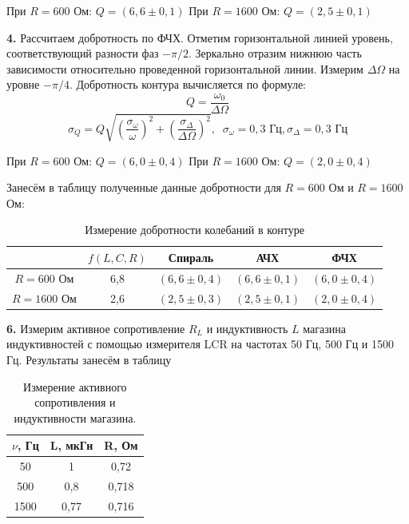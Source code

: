 \documentclass[a4paper, 12pt]{article}
\newcommand{\lr}[1]{\left({#1}\right)} %
\begin{document}
При $R = 600$ Ом: $Q = (6,6 \pm 0,1)$
При $R = 1600$ Ом: $Q = (2,5 \pm 0,1)$

\textbf{4.} Рассчитаем добротность по ФЧХ. Отметим горизонтальной линией уровень, соответствующий разности фаз $-\pi/2$. Зеркально отразим нижнюю часть зависимости относительно проведенной горизонтальной линии. Измерим $\Delta \Omega$ на уровне $-\pi/4$. Добротность контура вычисляется по формуле:
$$Q = \frac{\omega_0}{\Delta \Omega}$$
$$\sigma_Q = Q \sqrt{ \lr{\frac{\sigma_\omega}{\omega}}^2 + \lr{\frac{\sigma_\Delta}{\Delta \Omega}}^2 }, \;\; \sigma_\omega = 0,3 \text{ Гц}, \sigma_\Delta = 0,3 \text{ Гц}$$

При $R = 600$ Ом: $Q = (6,0 \pm 0,4)$
При $R = 1600$ Ом: $Q = (2,0 \pm 0,4)$

Занесём в таблицу полученные данные добротности для $R = 600$ Ом и $R = 1600$ Ом:

\begin{table}[H]
\centering
\caption{Измерение добротности колебаний в контуре}
\label{tab:5}
\begin{tabular}{|c|c|c|c|c|}
\hline
              & $f(L, C, R)$ & Спираль     & АЧХ             & ФЧХ             \\ \hline
$R = 600$ Ом  & 6,8          & $(6,6 \pm 0,4)$ & $(6,6 \pm 0,1)$ & $(6,0 \pm 0,4)$ \\ \hline
$R = 1600$ Ом & 2,6          & $(2,5 \pm 0,3)$ & $(2,5 \pm 0,1)$ & $(2,0 \pm 0,4)$ \\ \hline
\end{tabular}
\end{table}


\textbf{6.} Измерим активное сопротивление $R_L$ и индуктивность $L$ магазина индуктивностей с помощью измерителя LCR на частотах 50 Гц, 500 Гц и 1500 Гц. Результаты занесём в таблицу

\begin{table}[H]
\centering
\caption{Измерение активного сопротивления и индуктивности магазина.}
\label{tab:5}
\begin{tabular}{|c|c|c|}
\hline
$\nu$, Гц & L, мкГн & R, Ом \\ \hline
50    & 1       & 0,72  \\ \hline
500   & 0,8     & 0,718 \\ \hline
1500  & 0,77    & 0,716 \\ \hline
\end{tabular}
\end{table}
\end{document}
